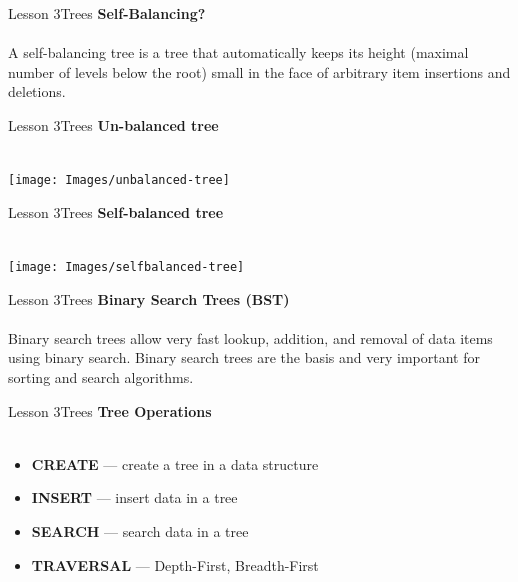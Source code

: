 \documentclass[aspectratio=1610]{beamer}
\begin{document}
\begin{frame}{Lesson 3}{Trees}
\LARGE
\textbf{Self-Balancing?}\\~\\
\Large
A self-balancing tree is a tree that automatically keeps its height
(maximal number of levels below the root) small in the face of
arbitrary item insertions and deletions.
\end{frame}


\begin{frame}{Lesson 3}{Trees}
\LARGE
\textbf{Un-balanced tree}\\~\\
\begin{center}
\texttt{[image: Images/unbalanced-tree]}
\end{center}
\end{frame}



\begin{frame}{Lesson 3}{Trees}
\LARGE
\textbf{Self-balanced tree}\\~\\
\begin{center}
\texttt{[image: Images/selfbalanced-tree]}
\end{center}
\end{frame}


\begin{frame}{Lesson 3}{Trees}
\LARGE
\textbf{Binary Search Trees (BST)}\\~\\
\Large
Binary search trees allow very fast lookup, addition, and removal of
data items using binary search. Binary search trees are the basis
and very important for sorting and search algorithms.
\end{frame}


\begin{frame}{Lesson 3}{Trees}
\LARGE
\textbf{Tree Operations}\\~\\
\Large
\begin{itemize}
\item \textbf{CREATE} — create a tree in a data structure
\item \textbf{INSERT} — insert data in a tree
\item \textbf{SEARCH} — search data in a tree
\item \textbf{TRAVERSAL} — Depth-First, Breadth-First
\end{itemize}
\end{frame}
\end{document}

